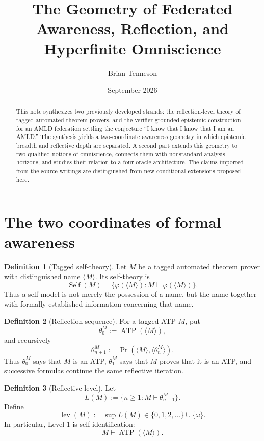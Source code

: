 \documentclass[11pt]{article}
\title{\textbf{The Geometry of Federated Awareness, Reflection, and Hyperfinite Omniscience}}
\author{Brian Tenneson}
\date{September 2026}
\theoremstyle{definition}
\newtheorem{definition}{Definition}[section]
\theoremstyle{plain}
\newcommand{\lev}{\operatorname{lev}}
\newcommand{\Self}{\operatorname{Self}}
\newcommand{\ATP}{\operatorname{ATP}}
\newcommand{\Prv}{\operatorname{Pr}}
\begin{document}
\maketitle

\begin{abstract}
This note synthesizes two previously developed strands: the reflection-level theory of tagged automated theorem provers, and the verifier-grounded epistemic construction for an AMLD federation settling the conjecture ``I know that I know that I am an AMLD.'' The synthesis yields a two-coordinate awareness geometry in which epistemic breadth and reflective depth are separated. A second part extends this geometry to two qualified notions of omniscience, connects them with nonstandard-analysis horizons, and studies their relation to a four-oracle architecture. The claims imported from the source writings are distinguished from new conditional extensions proposed here.
\end{abstract}

\section{The two coordinates of formal awareness}

\begin{definition}[Tagged self-theory]
Let $M$ be a tagged automated theorem prover with distinguished name $\langle M\rangle$. Its self-theory is
\[
\Self(M)=\{\varphi(\langle M\rangle):M\vdash\varphi(\langle M\rangle)\}.
\]
Thus a self-model is not merely the possession of a name, but the name together with formally established information concerning that name.
\end{definition}

\begin{definition}[Reflection sequence]
For a tagged ATP $M$, put
\[
\theta_0^M:=\ATP(\langle M\rangle),
\]
and recursively
\[
\theta_{n+1}^M:=\Prv(\langle M\rangle,\langle\theta_n^M\rangle).
\]
Thus $\theta_0^M$ says that $M$ is an ATP, $\theta_1^M$ says that $M$ proves that it is an ATP, and successive formulas continue the same reflective iteration.
\end{definition}

\begin{definition}[Reflective level]
Let
\[
L(M):=\{n\ge1:M\vdash\theta_{n-1}^M\}.
\]
Define
\[
\lev(M):=\sup L(M)\in\{0,1,2,\ldots\}\cup\{\omega\}.
\]
In particular, Level $1$ is self-identification:
\[
M\vdash\ATP(\langle M\rangle).
\]
\end{definition}
\end{document}
